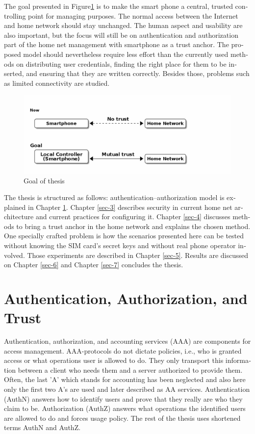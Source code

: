 \documentclass[12pt,a4paper,english]{tutthesis}
\begin{document}
\begin{otherlanguage}{english}
The goal presented in Figure\ref{fig:intro-goal} is to make the smart phone a central, trusted controlling 
point for managing purposes. The normal access between the
Internet and home network should stay unchanged. 
The human aspect and usability are also important, but the focus will
still be on authentication and authorization part of the home net
management with smartphone as a trust anchor.  The proposed model
should nevertheless require less effort than the currently used methods
on distributing user credentials, finding the right place for them to be
inserted, and ensuring that they are written correctly.
Besides those, problems such as limited connectivity are
studied.
\begin{figure}[htb]
\centering
\includegraphics[width=.9\linewidth]{intro-goal.png}
\caption{\label{fig:intro-goal}Goal of thesis}
\end{figure}





The thesis is structured as follows: authentication--authorization
model is explained in Chapter \ref{sec-2}.  Chapter \ref{sec-3}
describes security in current home net architecture and current
practices for configuring it.  Chapter \ref{sec-4} discusses methods
to bring a trust anchor in the home network and explains the chosen
method.
One specially crafted problem is how the scenarios presented here can be
tested without knowing the SIM card's secret keys and without real phone
operator involved.  Those experiments are described in Chapter \ref{sec-5}.
Results are discussed on Chapter \ref{sec-6} and Chapter \ref{sec-7} concludes the
thesis.
\chapter{Authentication, Authorization, and Trust}
\label{sec-2}



Authentication, authorization, and accounting services (AAA) are
components for access management.  AAA-protocols do not dictate
policies, i.e., who is granted access or what operations user is
allowed to do. They only transport this information between a client
who needs them and a server authorized to provide them.
Often, the last 'A' which stands for accounting has been neglected
and also here only the first two A's are used and later described as AA
services. Authentication (AuthN) answers how to identify users and
prove that they really are who they claim to be. Authorization (AuthZ)
answers what operations the identified users are allowed to do and
forces usage policy. The rest of the thesis uses shortened terms AuthN
and AuthZ.


\end{otherlanguage}
\end{document}
